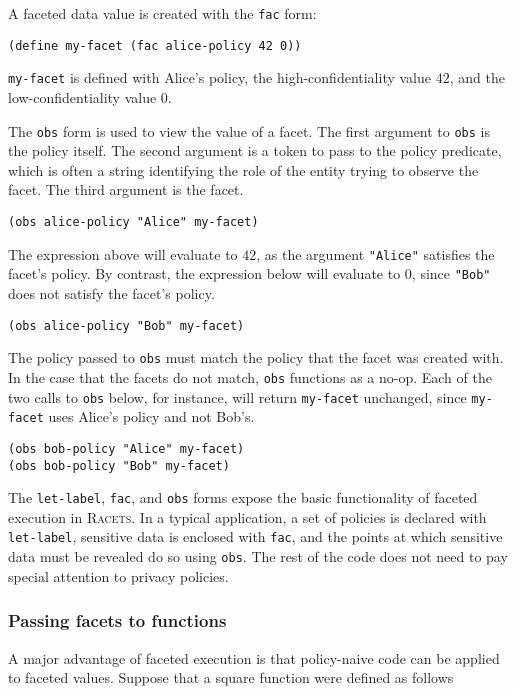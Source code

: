 \documentclass{article}
\begin{document}
A faceted data value is created with the \texttt{fac} form:

\begin{lstlisting}
(define my-facet (fac alice-policy 42 0))
\end{lstlisting}

\texttt{my-facet} is defined with Alice's policy, the high-confidentiality value $42$, and the low-confidentiality value $0$.

The \texttt{obs} form is used to view the value of a facet. The first argument to \texttt{obs} is the policy itself. The second argument is a token to pass to the policy predicate, which is often a string identifying the role of the entity trying to observe the facet. The third argument is the facet.

\begin{lstlisting}
(obs alice-policy "Alice" my-facet)
\end{lstlisting}

The expression above will evaluate to $42$, as the argument \texttt{"Alice"} satisfies the facet's policy. By contrast, the expression below will evaluate to $0$, since \texttt{"Bob"} does not satisfy the facet's policy.

\begin{lstlisting}
(obs alice-policy "Bob" my-facet)
\end{lstlisting}

The policy passed to \texttt{obs} must match the policy that the facet was created with. In the case that the facets do not match, \texttt{obs} functions as a no-op. Each of the two calls to \texttt{obs} below, for instance, will return \texttt{my-facet} unchanged, since \texttt{my-facet} uses Alice's policy and not Bob's.

\begin{lstlisting}
(obs bob-policy "Alice" my-facet)
(obs bob-policy "Bob" my-facet)
\end{lstlisting}

The \texttt{let-label}, \texttt{fac}, and \texttt{obs} forms expose the basic functionality of faceted execution in \textsc{Racets}. In a typical application, a set of policies is declared with \texttt{let-label}, sensitive data is enclosed with \texttt{fac}, and the points at which sensitive data must be revealed do so using \texttt{obs}. The rest of the code does not need to pay special attention to privacy policies.


\subsubsection{Passing facets to functions}
A major advantage of faceted execution is that policy-naive code can be applied to faceted values. Suppose that a square function were defined as follows
\end{document}
